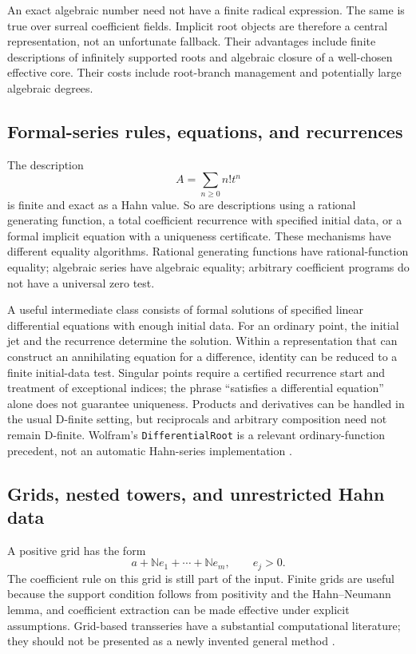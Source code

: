 \documentclass[11pt,letterpaper]{article}
\numberwithin{equation}{section}
\theoremstyle{definition}
\theoremstyle{remark}\newtheorem{remark}[theorem]{Remark}
\newcommand{\N}{\mathbb N}
\begin{document}
An exact algebraic number need not have a finite radical expression. The same
is true over surreal coefficient fields. Implicit root objects are therefore
a central representation, not an unfortunate fallback. Their advantages include
finite descriptions of infinitely supported roots and algebraic closure of
a well-chosen effective core. Their costs include root-branch management and
potentially large algebraic degrees.

\subsection{Formal-series rules, equations, and recurrences}
The description
\[
 A=\sum_{n\ge0}n!t^n
\]
is finite and exact as a Hahn value. So are descriptions using a rational
generating function, a total coefficient recurrence with specified initial
data, or a formal implicit equation with a uniqueness certificate. These
mechanisms have different equality algorithms. Rational generating functions
have rational-function equality; algebraic series have algebraic equality;
arbitrary coefficient programs do not have a universal zero test.

A useful intermediate class consists of formal solutions of specified linear
differential equations with enough initial data. For an ordinary point, the
initial jet and the recurrence determine the solution. Within a representation
that can construct an annihilating equation for a difference, identity can be
reduced to a finite initial-data test. Singular points require a certified
recurrence start and treatment of exceptional indices; the phrase
``satisfies a differential equation'' alone does not guarantee uniqueness.
Products and derivatives can be handled in the usual D-finite setting, but
reciprocals and arbitrary composition need not remain D-finite. Wolfram's
\texttt{DifferentialRoot} is a relevant ordinary-function precedent, not an
automatic Hahn-series implementation \cite{WLDifferentialRoot}.

\subsection{Grids, nested towers, and unrestricted Hahn data}
A positive grid has the form
\begin{equation}\label{eq:grid}
 a+\N e_1+\cdots+\N e_m,\qquad e_j>0.
\end{equation}
The coefficient rule on this grid is still part of the input. Finite grids
are useful because the support condition follows from positivity and the
Hahn--Neumann lemma, and coefficient extraction can be made effective under
explicit assumptions. Grid-based transseries have a substantial computational
literature; they should not be presented as a newly invented general method
\cite{vdH}.
\end{document}
